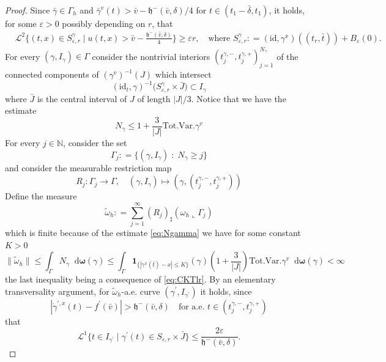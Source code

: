 \documentclass[11pt, twoside, reqno]{amsart}
\theoremstyle{definition}
\theoremstyle{remark}
\numberwithin{equation}{section}
\newcommand*\dif{\mathop{}\!\mathrm{d}}
\newcommand{\mr}[1]{\mathrm{#1}}
\newcommand{\bs}[1]{\boldsymbol{#1}}
\newcommand{\msc}[1]{\mathscr{#1}}
\begin{document}
\begin{proof}
Since $\bar \gamma \in \Gamma_h$ and $\bar \gamma^v(t) > \bar v- \mathfrak h^-(\bar v, \delta)/4$ for $t \in (t_1-\bar \delta, t_1)$, it holds, for some $\varepsilon>0$ possibly depending on $r$, that 
\begin{equation}
\begin{aligned}
    & \msc L^2 \Bigg\{ (t, x) \in S^\gamma_{\varepsilon, r} \; \Big| \; u(t, x) > \bar v- \frac{\mathfrak h^-(\bar v, \delta)}{4}\Bigg\} \geq \varepsilon r, \quad \text{where $S^\gamma_{\varepsilon, r}   : = (\mr{id}, \gamma^x)((t_r, \bar t)) + B_{\varepsilon}(0)$}.
    \end{aligned}
\end{equation}
For every $(\gamma, I_{\gamma}) \in \Gamma$ consider the nontrivial interiors $(t_{j}^{\gamma, -},t_{j}^{\gamma, +})_{j=1}^{N_{\gamma}}$ of the connected components of $(\gamma^v)^{-1}(J)$ which intersect
$$
(\mr{id}_t, \gamma)^{-1}\big( S^\gamma_{\varepsilon, r} \times \bar J \big)  \subset I_{\gamma}
$$
where $\bar J$ is the central interval of $J$ of length $|J|/3$. Notice that we have the estimate
\begin{equation}\label{eq:Ngamma}
N_{\gamma} \leq 1+ \frac{3}{|J|}\mr{Tot.Var.}\gamma^v
\end{equation}
For every $j \in \mathbb N$, consider the set 
$$
\Gamma_j : = \{(\gamma, I_{\gamma})\; : \; N_{\gamma} \geq j\}
$$
and consider the measurable restriction  map 
$$
R_j : \Gamma_j \to \Gamma, \quad (\gamma, I_{\gamma} ) \mapsto (\gamma, (t_{j}^{\gamma,-}, t_{j}^{\gamma,+}))
$$
Define the measure 
$$
\tilde \omega_h : = \sum_{j = 1}^{\infty} (R_j)_{\sharp} (\omega_h \llcorner \Gamma_j)
$$
which is finite because of the estimate \eqref{eq:Ngamma} we have for some constant $K> 0$
$$
\|\tilde \omega_h\| \leq \int_{\Gamma} N_\gamma \dif \bs \omega(\gamma)  \leq \int_{\Gamma} \mathbf 1_{\{|\gamma^x(\bar t)- x| \leq K\}}(\gamma)\left(1+\frac{3}{|J|}\right) \mr{Tot.Var.}\gamma^v \dif \bs \omega(\gamma) < \infty
$$
the last inequality being a consequence of \eqref{eq:CKTlr}.
By an elementary transversality argument, for $\tilde \omega_h$-a.e. curve $(\gamma^\prime, I_{\gamma^\prime})$ it holds, since 
$$
|\dot \gamma^{\prime, x}(t) - f^\prime(\bar v)| > \mathfrak h^-(\bar v, \delta) \quad \text{for a.e. $t \in (t_{j}^{\gamma,-}, t_{j}^{\gamma,+})$}
$$
that
\begin{equation}\label{eq:transvers}
\msc L^1 \Big\{ t \in I_{\gamma^\prime} \; \Big| \; \gamma^\prime(t) \in S_{\varepsilon,r} \times \bar J \Big\} \leq  \frac{2\varepsilon}{\mathfrak h^-(\bar v, \delta)}.
\end{equation}

\end{proof}
\end{document}

